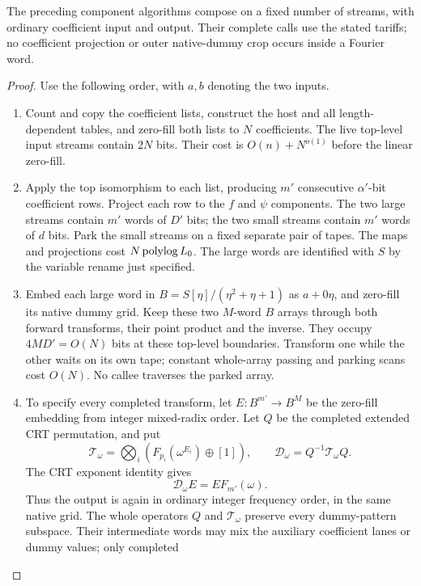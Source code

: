 \begin{lemma}
\label{lem:typed-execution}
The preceding component algorithms compose on a fixed number of streams,
with ordinary coefficient input and output. Their complete calls use
the stated tariffs; no coefficient projection or outer native-dummy crop
occurs inside a Fourier word.
\end{lemma}
\begin{proof}
Use the following order, with $a,b$ denoting the two inputs.
\begin{enumerate}
\item Count and copy the coefficient lists, construct the host and all
length-dependent tables, and zero-fill both lists to $N$ coefficients.
The live top-level input streams contain $2N$ bits. Their cost is
$O(n)+N^{o(1)}$ before the linear zero-fill.
\item Apply the top isomorphism to each list, producing $m'$ consecutive
$\alpha'$-bit coefficient rows. Project each row to the $f$ and $\psi$
components. The two large streams contain $m'$ words of $D'$ bits;
the two small streams contain $m'$ words of $d$ bits. Park the small
streams on a fixed separate pair of tapes. The maps and projections cost
$N\operatorname{polylog} L_0$. The large words are identified with $S$ by the variable
rename just specified.
\item Embed each large word in $B=S[\eta]/(\eta^2+\eta+1)$ as $a+0\eta$,
and zero-fill its native dummy grid. Keep these two $M$-word $B$ arrays
through both forward transforms, their point product and the inverse.
They occupy $4MD'=O(N)$ bits at these top-level boundaries.
Transform one while the other waits on its own tape; constant whole-array
passing and parking scans cost $O(N)$. No callee traverses the parked
array.
\item To specify every completed transform, let $E:B^{m'}\to B^M$
be the zero-fill embedding from integer mixed-radix order. Let $Q$ be
the completed extended CRT permutation, and put
\[
 \mathcal T_{\omega}=\bigotimes_i(F_{p_i}(\omega^{E_i})\oplus[1]),
 \qquad \mathcal D_{\omega}=Q^{-1}\mathcal T_{\omega}Q.
\]
The CRT exponent identity gives
\begin{equation}
 \label{eq:typed-dft}
 \mathcal D_{\omega}E=E F_{m'}(\omega).
\end{equation}
Thus the output is again in ordinary integer frequency order, in the
same native grid. The whole operators $Q$ and $\mathcal T_\omega$
preserve every dummy-pattern subspace. Their intermediate words may
mix the auxiliary coefficient lanes or dummy values; only completed

\end{enumerate}
\end{proof}
